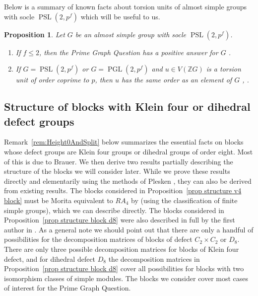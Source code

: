 \documentclass[11pt, a4paper]{amsart}
\newtheorem{proposition}[theorem]{Proposition}
\theoremstyle{definition}
\theoremstyle{definition}
\newcommand{\PSL}{{\operatorname{PSL}}}
\newcommand{\PGL}{{\operatorname{PGL}}}
\renewcommand{\leq}{\leqslant}
\begin{document}
Below is a summary of known facts about torsion units of almost simple groups with socle $\PSL(2,p^f)$ which will be useful to us.

\begin{proposition}\label{prop:PSL2KnwonStuff}
Let $G$ be an almost simple group with socle $\PSL(2,p^f)$.
\begin{enumerate}
\item If $f \leq 2$, then the Prime Graph Question has a positive answer for $G$ \cite[Proposition 3.4 and Theorem 3.5]{BachleMargolis4primaryI}.
\item If $G = \PSL(2,p^f)$ or $G = \PGL(2,p^f)$ and $u \in V(\mathbb{Z}G)$ is a torsion unit of order coprime to $p$, then $u$ has the same order as an element of $G$ \cite[Proposition 6.7]{HertweckBrauer}, \cite[Proposition 3.4]{BachleMargolis4primaryI}.
\end{enumerate}
\end{proposition}


\subsection{Structure of blocks with Klein four or dihedral defect groups}


Remark~\ref{rem:Height0AndSplit} below summarizes the essential facts on blocks whose defect groups are Klein four groups or dihedral groups of order eight. Most of this is due to Brauer. We then derive two results partially describing the structure of the blocks we will consider later. While we prove these results directly and elementarily using the methods of Plesken \cite{Plesken}, they can also be derived from existing results. The blocks considered in Proposition~\ref{prop structure v4 block} must be Morita equivalent to $RA_4$ by \cite[Theorem 1.1]{CravenEtAl} (using the classification of finite simple groups), which we can describe directly. The blocks considered in Proposition~\ref{prop structure block d8} were also described in full by the first author in \cite{EiseleDerEq}. As a general note we should point out that there are only a handful of possibilities for the decomposition matrices of blocks of defect $C_2\times C_2$ or $D_8$. There are only three possible decomposition matrices for blocks of Klein four defect, and for dihedral defect $D_8$ the decomposition matrices in Proposition~\ref{prop structure block d8} cover all possibilities for blocks with two isomorphism classes of simple modules. The blocks we consider cover most cases of interest for the Prime Graph Question.
\end{document}
